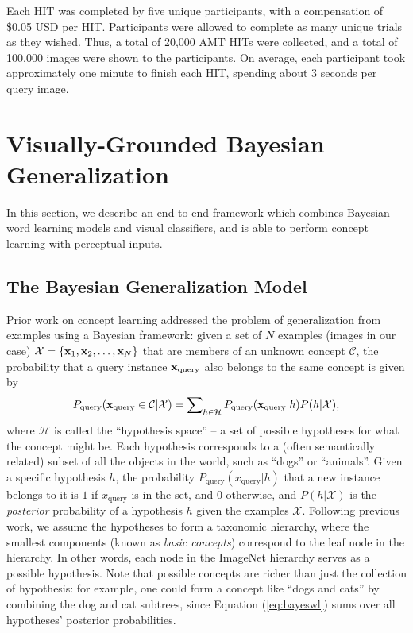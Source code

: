 Each HIT was completed by five unique participants, with a compensation of \$0.05 USD per HIT. Participants were allowed to complete as many unique trials as they wished. Thus, a total of 20,000 AMT HITs were collected, and a total of 100,000 images were shown to the participants. On average, each participant took approximately one minute to finish each HIT, spending about 3 seconds per query image.

\section{Visually-Grounded Bayesian Generalization}

In this section, we describe an end-to-end framework which combines Bayesian word learning models and visual classifiers, and is able to perform concept learning with perceptual inputs.

\subsection{The Bayesian Generalization Model}
Prior work on concept learning \cite{xu2007word} addressed the problem of generalization from examples using a Bayesian framework: given a set of $N$ examples (images in our case) $\mathcal{X} = \{ \mathbf{x}_1, \mathbf{x}_2,\ldots, \mathbf{x}_N \}$ that are members of an unknown concept $\mathcal{C}$, the probability that a query instance $\mathbf{x}_\mathrm{query}$ also belongs to the same concept is given by
\begin{equation}
P_{\mathrm{query}}(\mathbf{x}_\mathrm{query} \in \mathcal{C}|\mathcal{X}) = \sum\nolimits_{h \in \mathcal{H}} P_{\mathrm{query}}(\mathbf{x}_\mathrm{query} | h)P(h|\mathcal{X}), \label{eq:bayeswl}
\end{equation}
where $\mathcal{H}$ is called the ``hypothesis space'' -- a set of possible hypotheses for what the concept might be. Each hypothesis corresponds to a (often semantically related) subset of all the objects in the world, such as ``dogs'' or ``animals''. Given a specific hypothesis $h$, the probability $P_{\mathrm{query}}(x_\mathrm{query}|h)$ that a new instance belongs to it is $1$ if $x_\mathrm{query}$ is in the set, and $0$ otherwise, and $P(h | \mathcal{X})$ is the \emph{posterior} probability of a hypothesis $h$ given the examples $\mathcal{X}$. Following previous work, we assume the hypotheses to form a taxonomic hierarchy, where the smallest components (known as \emph{basic concepts}) correspond to the leaf node in the hierarchy. In other words, each node in the ImageNet hierarchy serves as a possible hypothesis. Note that possible concepts are richer than just the collection of hypothesis: for example, one could form a concept like ``dogs and cats'' by combining the dog and cat subtrees, since Equation (\ref{eq:bayeswl}) sums over all hypotheses' posterior probabilities.

